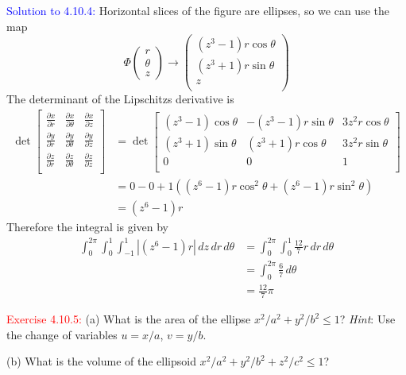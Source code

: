 \documentclass[12pt]{article}
\newcommand{\pder}[2]{\frac{\partial #1}{\partial #2}}
\begin{document}
\textcolor{blue}{Solution to 4.10.4:}
Horizontal slices of the figure are ellipses, so we can use the map
\[
    \Phi\begin{pmatrix} r \\ \theta \\ z\end{pmatrix} \to 
    \begin{pmatrix}
        (z^3-1)r\cos \theta \\
        (z^3+1)r\sin \theta \\
        z \\
    \end{pmatrix}
\]
The determinant of the Lipschitzs derivative is 
\begin{align*}
    \det 
    \begin{bmatrix}
        \pder{x}{r} & \pder{x}{\theta} & \pder{x}{z} \\
        \pder{y}{r} & \pder{y}{\theta} & \pder{y}{z} \\
        \pder{z}{r} & \pder{z}{\theta} & \pder{z}{z} \\
    \end{bmatrix} 
    &= \det 
    \begin{bmatrix}
        (z^3-1)\cos \theta & -(z^3-1)r\sin \theta &  3z^2r\cos \theta\\
        (z^3+1)\sin \theta & (z^3+1)r\cos \theta & 3z^2r\sin \theta \\
        0 & 0 & 1 \\
    \end{bmatrix} \\
    &= 0 - 0 + 1((z^6-1)r\cos^2\theta + (z^6-1)r\sin^2\theta) \\
    &= (z^6-1)r
\end{align*}
Therefore the integral is given by 
\begin{align*}
    \int_0^{2\pi} \int_0^1 \int_{-1}^1 |(z^6-1)r| \,dz \,dr \,d\theta
    &= \int_0^{2\pi} \int_0^1  \frac{12}{7}r \,dr \,d\theta \\
    &= \int_0^{2\pi} \frac{6}{7} \,d\theta \\
    &= \frac{12}{7} \pi
\end{align*}
\newpage

\textcolor{red}{Exercise 4.10.5:} (a) What is the area of the ellipse $x^2/a^2 + y^2 /b^2 \leq 1$? \emph{Hint}: Use the change of variables $u=x/a$, $v=y/b$.

(b) What is the volume of the ellipsoid $x^2/a^2 + y^2 /b^2 + z^2/c^2 \leq 1$?
\medskip
\end{document}
